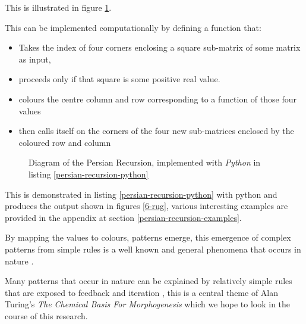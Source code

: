 \documentclass[11pt]{article}
\begin{document}
This is illustrated in figure \ref{persian-recursion-diagram}.

This can be implemented computationally by defining a function that:

\begin{itemize}
\item Takes the index of four corners enclosing a square sub-matrix of some matrix as input,
\item proceeds only if that square is some positive real value.
\item colours the centre column and row corresponding to a function of those four values
\item then calls itself on the corners of the four new sub-matrices enclosed by the
coloured row and column
\end{itemize}


\begin{figure}[htbp]
\centering

\caption{\label{persian-recursion-diagram}Diagram of the Persian Recursion, implemented with \emph{Python} in listing \ref{persian-recursion-python}}
\end{figure}

This is demonstrated in listing \ref{persian-recursion-python} with python and produces the output shown in figures \ref{6-rug}, various interesting examples are provided in the appendix at section \ref{persian-recursion-examples}.

By mapping the values to colours, patterns emerge, this emergence of complex
patterns from simple rules is a well known and general phenomena that occurs in nature
\cite{EmergenceHowStupid2017,kivelsonDefiningEmergencePhysics2016}.

Many patterns that occur in nature can be explained by relatively simple rules
that are exposed to feedback and iteration
\cite[p. 16]{peitgenChaosFractalsNew2004}, this is a central theme of Alan
Turing's \emph{The Chemical Basis For Morphogenesis}
\cite{turingChemicalBasisMorphogenesis1952} which we hope to look in the course of
this research.
\end{document}

